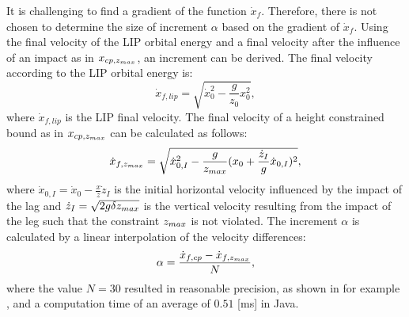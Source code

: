It is challenging to find a gradient of the function $\dot{x}_f$. Therefore, there is not chosen to determine the size of increment $\alpha$ based on the gradient of $\dot{x}_f$. Using the final velocity of the \ac{LIP} orbital energy and a final velocity after the influence of an impact as in $x_{cp,z_{max}}$, an increment can be derived. 
The final velocity according to the \ac{LIP} orbital energy is:
\begin{equation}
	\dot{x}_{f,lip} = \sqrt{\dot{x}_0^2-\frac{g}{z_0}x_0^2},
\end{equation}
where $\dot{x}_{f,lip}$ is the \ac{LIP} final velocity. The final velocity of a height constrained bound as in $x_{cp,z_{max}}$ can be calculated as follows:
\begin{equation}
	\dot{x}_{f,z_{max}} = \sqrt{\dot{x}_{0,I}^2-\frac{g}{z_{max}}(x_0+\frac{\dot{z}_I}{g}\dot{x}_{0,I})^2},
\end{equation}
where $\dot{x}_{0,I}=\dot{x}_0 - \frac{x}{z}\dot{z}_I$ is the initial horizontal velocity influenced by the impact of the lag and $\dot{z}_I = \sqrt{2g\delta z_{max}}$ is the vertical velocity resulting from the impact of the leg such that the constraint $z_{max}$ is not violated. The increment $\alpha$ is calculated by a linear interpolation of the velocity differences:
\begin{equation}
	\alpha =\frac{\dot{x}_{f,cp} -\dot{x}_{f,z_{max}}}{N},
\end{equation}
where the value $N=30$ resulted in reasonable precision, as shown in for example , and a computation time of an average of $0.51$ [ms] in Java.

